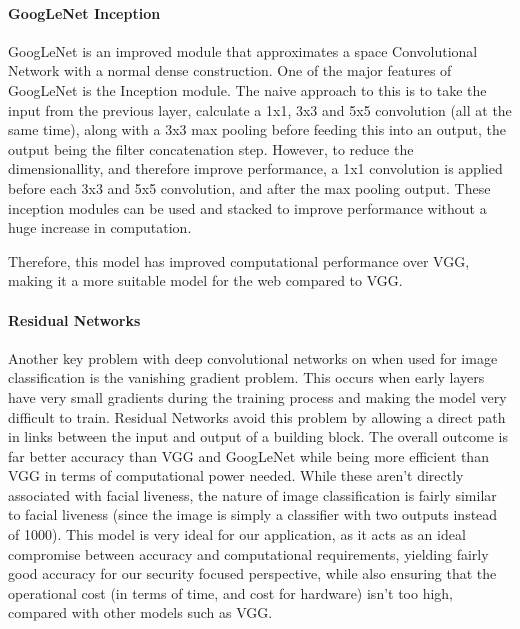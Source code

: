 \documentclass[10pt,a4paper]{article}
\begin{document}
            \paragraph{GoogLeNet Inception}
            GoogLeNet is an improved module that approximates a space Convolutional Network with a normal
            dense construction. One of the major features of GoogLeNet is the Inception module. The naive approach to this 
            is to take the input from the previous layer, calculate a 1x1, 3x3 and 5x5 convolution (all at the same time), along with
            a 3x3 max pooling before feeding this into an output, the output being the filter concatenation step.
            However, to reduce the dimensionallity, and therefore improve performance, a 1x1 convolution is applied before
            each 3x3 and 5x5 convolution, and after the max pooling output. These inception modules can be used and stacked
            to improve performance without a huge increase in computation. \cite{GoogLeNet} 
    
            Therefore, this model has improved computational performance over VGG, making it a more suitable model for the web compared to VGG. \cite{DeepNeuralNetworkDeployability}
            
            \paragraph{Residual Networks}
            Another key problem with deep convolutional networks on when used for image classification is the vanishing gradient problem. This occurs when early layers have very small gradients during the training process and
            making the model very difficult to train. Residual Networks avoid this problem by allowing a direct path in links between the input and output of a building block.
            The overall outcome is far better accuracy than VGG and GoogLeNet while being more efficient than VGG in terms of computational power needed. \cite{DeepResidualNetworks}
            While these aren't directly associated with facial liveness, the nature of image classification is fairly similar to facial liveness (since the image is simply a classifier with two outputs instead of 1000).
            This model is very ideal for our application, as it acts as an ideal compromise between accuracy and computational requirements, yielding fairly good accuracy for our security focused perspective, while also
            ensuring that the operational cost (in terms of time, and cost for hardware) isn't too high, compared with other models such as VGG.
\end{document}
